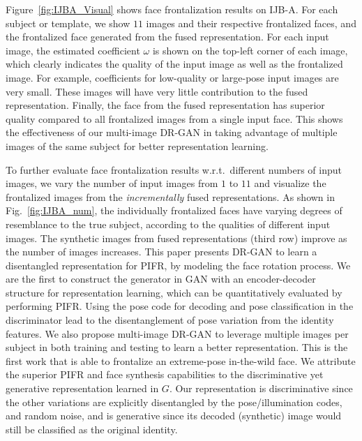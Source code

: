 \documentclass[10pt,journal,compsoc]{IEEEtran}
\begin{document}
%

Figure~\ref{fig:IJBA_Visual} shows face frontalization results on IJB-A. 
For each subject or template, we show $11$ images and their respective frontalized faces, and the frontalized face generated from the fused representation. 
For each input image, the estimated coefficient $\omega$ is shown on the top-left corner of each image, which clearly indicates the quality of the input image as well as the frontalized image. 
For example, coefficients for low-quality or large-pose input images are very small. 
These images will have very little contribution to the fused representation. 
Finally, the face from the fused representation has superior quality compared to all frontalized images from a single input face. 
This shows the effectiveness of our multi-image DR-GAN in taking advantage of multiple images of the same subject for better representation learning. 

To further evaluate face frontalization results w.r.t.~different numbers of input images, we vary the number of input images from $1$ to $11$ and visualize the frontalized images from the {\it incrementally} fused representations. 
%
As shown in Fig.~\ref{fig:IJBA_num}, the individually frontalized faces have varying degrees of resemblance to the true subject, according to the qualities of different input images. 
The synthetic images from fused representations (third row) improve as the number of images increases. 
This paper presents DR-GAN to learn a disentangled representation for PIFR, by modeling the face rotation process. 
We are the first to construct the generator in GAN with an encoder-decoder structure for representation learning, which can be quantitatively evaluated by performing PIFR.  
Using the pose code for decoding and pose classification in the discriminator lead to the disentanglement of pose variation from the identity features. 
We also propose multi-image DR-GAN to leverage multiple images per subject in both training and testing to learn a better representation. %
This is the first work that is able to frontalize an extreme-pose in-the-wild face. 
We attribute the superior PIFR and face synthesis capabilities to the discriminative yet generative representation learned in $G$. 
Our representation is discriminative since the other variations are explicitly disentangled by the pose/illumination codes, and random noise, and is generative since its decoded (synthetic) image would still be classified as the original identity.
\end{document}
